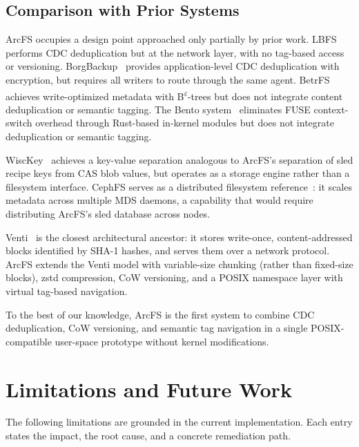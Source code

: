 \documentclass[5p,times]{elsarticle}
\begin{document}
\subsection{Comparison with Prior Systems}

ArcFS occupies a design point approached only partially by prior work.
LBFS~\cite{muthitacharoen2001lbfs} performs CDC deduplication but at the
network layer, with no tag-based access or versioning.
BorgBackup~\cite{borgbackup2024} provides application-level CDC
deduplication with encryption, but requires all writers to route through
the same agent. BetrFS~\cite{jannen2015betrfs} achieves write-optimized
metadata with B\textsuperscript{$\varepsilon$}-trees but does not integrate
content deduplication or semantic tagging. The Bento
system~\cite{miller2021bento} eliminates FUSE context-switch overhead
through Rust-based in-kernel modules but does not integrate deduplication
or semantic tagging.

WiscKey~\cite{lu2017wisckey} achieves a key-value separation analogous to
ArcFS's separation of sled recipe keys from CAS blob values, but operates
as a storage engine rather than a filesystem interface.  CephFS
serves as a distributed filesystem reference~\cite{weil2006ceph}: it scales
metadata across multiple MDS daemons, a capability that would require
distributing ArcFS's sled database across nodes.

Venti~\cite{quinlan2002venti} is the closest architectural ancestor: it
stores write-once, content-addressed blocks identified by SHA-1 hashes,
and serves them over a network protocol.  ArcFS extends the Venti model
with variable-size chunking (rather than fixed-size blocks), zstd
compression, CoW versioning, and a POSIX namespace layer with virtual
tag-based navigation.

To the best of our knowledge, ArcFS is the first system to combine
CDC deduplication, CoW versioning, and semantic tag navigation in a
single POSIX-compatible user-space prototype without kernel
modifications.

\section{Limitations and Future Work}
\label{sec:limits}

The following limitations are grounded in the current implementation.
Each entry states the impact, the root cause, and a concrete remediation
path.
\end{document}
